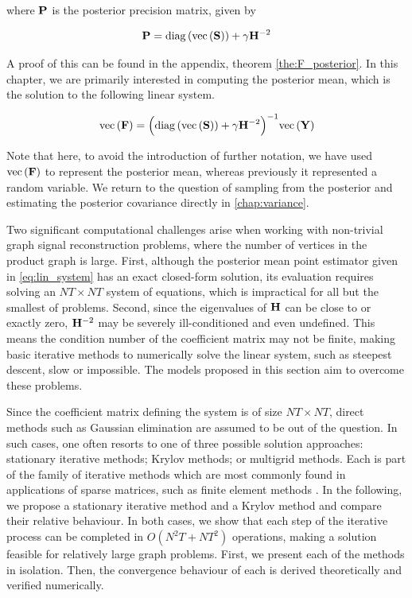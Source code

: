 \noindent where $\mathbf{P}$ is the posterior precision matrix, given by 

\begin{equation}
    \label{eq:P_post_gsr}
    \mathbf{P} = \text{\textup{diag}}\left(\text{\textup{vec}}\left(\mathbf{S}\right)\right) + \gamma  \mathbf{H}^{-2}
\end{equation}

A proof of this can be found in the appendix, theorem \ref{the:F_posterior}. In this chapter, we are primarily interested in computing the posterior mean, which is the solution to the following linear system.

\begin{equation}
    \label{eq:lin_system}
    \text{\textup{vec}}\left(\mathbf{F}\right) = \Big(\text{\textup{diag}}\left(\text{\textup{vec}}\left(\mathbf{S}\right)\right) + \gamma  \mathbf{H}^{-2}\Big)^{-1} \text{\textup{vec}}\left(\mathbf{Y}\right)
\end{equation}

Note that here, to avoid the introduction of further notation, we have used $\text{\textup{vec}}\left(\mathbf{F}\right)$ to represent the posterior mean, whereas previously it represented a random variable. We return to the question of sampling from the posterior and estimating the posterior covariance directly in \cref{chap:variance}.

Two significant computational challenges arise when working with non-trivial graph signal reconstruction problems, where the number of vertices in the product graph is large. First, although the posterior mean point estimator given in \cref{eq:lin_system} has an exact closed-form solution, its evaluation requires solving an $NT \times NT$ system of equations, which is impractical for all but the smallest of problems. Second, since the eigenvalues of $\mathbf{H}$ can be close to or exactly zero, $\mathbf{H}^{-2}$ may be severely ill-conditioned and even undefined. This means the condition number of the coefficient matrix may not be finite, making basic iterative methods to numerically solve the linear system, such as steepest descent, slow or impossible. The models proposed in this section aim to overcome these problems.


Since the coefficient matrix defining the system is of size $NT \times NT $, direct methods such as Gaussian elimination are assumed to be out of the question. In such cases, one often resorts to one of three possible solution approaches: stationary iterative methods; Krylov methods; or multigrid methods. Each is part of the family of iterative methods which are most commonly found in applications of sparse matrices, such as finite element methods \citep{Brenner2008}. In the following, we propose a stationary iterative method and a Krylov method and compare their relative behaviour. In both cases, we show that each step of the iterative process can be completed in $O(N^2T + NT^2)$ operations, making a solution feasible for relatively large graph problems. First, we present each of the methods in isolation. Then, the convergence behaviour of each is derived theoretically and verified numerically.

